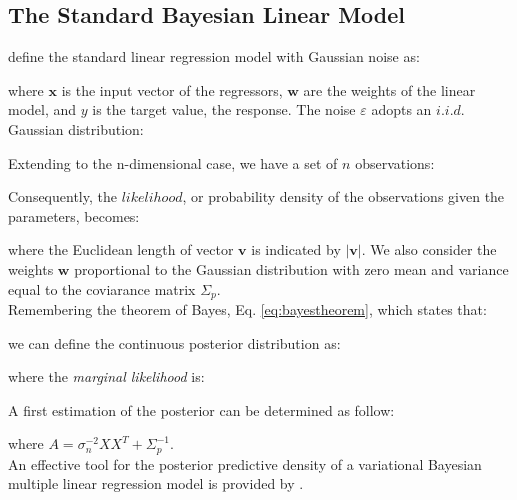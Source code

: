 \subsection{The Standard Bayesian Linear Model}
\label{subsec:standardlinearmodel}

\citet{RefWorks:192} define the standard linear regression model with Gaussian noise as:

where $\mathbf{x}$ is the input vector of the regressors, $\mathbf{w}$ are the
weights of the linear model, and $y$ is the target value, the response. The
noise $\varepsilon$ adopts an $i.i.d.$ Gaussian distribution:

Extending to the n-dimensional case, we have a set of $n$ observations:

Consequently, the $likelihood$, or probability density of the observations given
the parameters, becomes:

where the Euclidean length of vector $\mathbf{v}$ is indicated by
$|\mathbf{v}|$.
We also consider the weights $\mathbf{w}$ proportional to the Gaussian
distribution with zero mean and variance equal to the coviarance matrix
$\Sigma_p$.\\
Remembering the theorem of Bayes, Eq. \ref{eq:bayestheorem}, which states that:

we can define the continuous posterior distribution as:

where the \textit{marginal likelihood} is:

A first estimation of the posterior can be determined as follow:

where $A = \sigma_n^{-2} X X^T + \Sigma_p^{-1}$.\\
An effective tool for the posterior predictive density of a variational Bayesian
multiple linear regression model is provided by \citet{RefWorks:193}.



